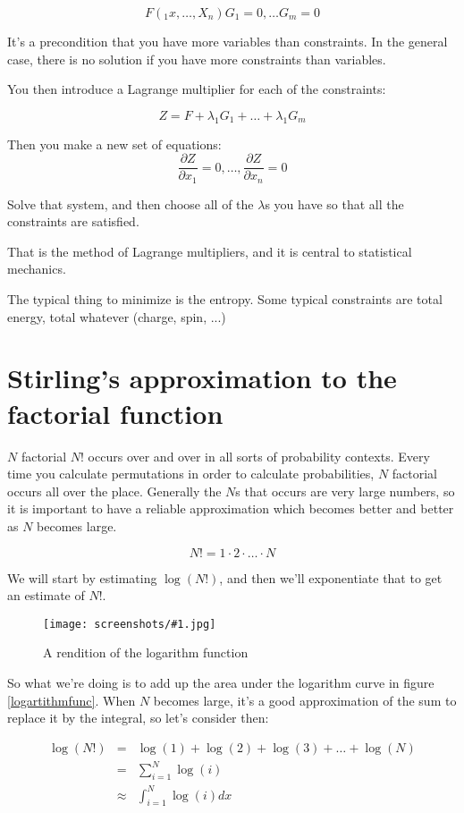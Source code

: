 \documentclass[a4, 12pt, english, USenglish]{scrreprt}
\newcommand{\screenshot}[2]{
\begin{figure}[htb]
\texttt{[image: screenshots/\#1.jpg]}
\label{#1}
\caption{#2}
\end{figure}}
\begin{document}
\[F(_1x, \ldots, X_n)
G_1=0, \ldots G_m = 0
\]

It's a precondition that you have more variables than constraints.  In
the general case, there is no solution if you have more constraints
than variables.

You then introduce a Lagrange multiplier for each of the constraints:

\[Z = F + \lambda_1 G_1  + \ldots + \lambda_1 G_m \]

Then you make a new set of equations:
\[
  \frac{\partial Z}{\partial x_1} = 0, \ldots,   \frac{\partial Z}{\partial x_n} = 0
\]

Solve that system, and then choose all of the \(\lambda\)s you have so
that all the constraints are satisfied.

That is the method of Lagrange multipliers, and it is central to
statistical mechanics.

The typical thing to minimize is the entropy. Some typical constraints
are total energy, total whatever (charge, spin, ...)

\section{Stirling's approximation to the factorial function}

\(N\) factorial \(N!\) occurs over and over in all sorts of probability
contexts.  Every time you calculate permutations in order to calculate
probabilities, \(N\) factorial occurs all over the place. Generally the \(N\)s
that occurs are very large numbers, so it is important to have a
reliable approximation which becomes better and better as \(N\) becomes large.

\[    N! = 1\cdot 2 \cdot \ldots \cdot N  \]

We will start by estimating \(\log(N!)\), and then we'll exponentiate
that to get an estimate of \(N!\).

\screenshot{logarithmfunc}{A rendition of the logarithm function}

So what we're doing is to add up the area under the logarithm curve in
figure \ref{logartithmfunc}.  When \(N\) becomes large, it's a good
approximation of the sum to replace it by the integral, so let's
consider then:


\[
\begin{array}{lcl}
    \log(N!) &=& \log(1) + \log(2) + \log(3) +  \ldots + \log(N)  \\
                 &=& \sum_{i=1}^N \log(i) \\
                &\approx& \int_{i=1}^N \log(i) dx
\end{array}
\]
\end{document}
